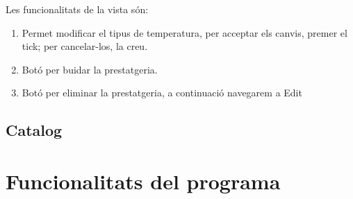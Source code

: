 \documentclass[a4paper,12pt]{article}
\begin{document}
	\noindent Les funcionalitats de la vista són:
	
	\begin{enumerate}[itemsep=0pt, topsep=0pt]
		\item Permet modificar el tipus de temperatura, per acceptar els canvis, premer el tick; per cancelar-los, la creu.
		\item Botó per buidar la prestatgeria.
		\item Botó per eliminar la prestatgeria, a continuació navegarem a Edit\
	\end{enumerate}
	
	\newpage
	\subsection{Catalog}
	
	
	\newpage
	\section{Funcionalitats del programa}
	
\end{document}
